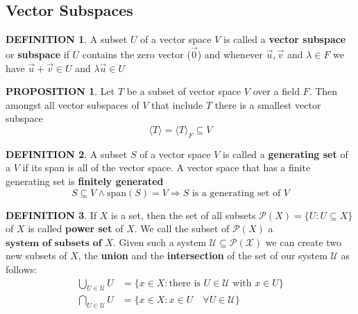 \documentclass[12pt]{article}
\theoremstyle{definition}
\newtheorem{definition}{DEFINITION}[subsection]
\newtheorem{prop}{PROPOSITION}[subsection]
\begin{document}
\subsection{Vector Subspaces}
\begin{definition}
    A subset $U$ of a vector space $V$ is called a \textbf{vector subspace} or \textbf{subspace} if $U$ contains the zero vector ($\overrightarrow{0}$) and whenever $\overrightarrow{u},\overrightarrow{v}$ and $\lambda \in F$ we have $\overrightarrow{u}+\overrightarrow{v}\in U$ and $\lambda\overrightarrow{u}\in U$
\end{definition}
\begin{prop}
    Let $T$ be a subset of vector space $V$ over a field $F$. Then amongst all vector subspaces of $V$ that include $T$ there is a smallest vector subspace
    $$\langle T \rangle = \langle T \rangle_F \subseteq V$$
\end{prop}
\begin{definition}
    A subset $S$ of a vector space $V$ is called a \textbf{generating set} of a $V$ if its span is all of the vector space. A vector space that has a finite generating set is \textbf{finitely generated}
    $$ S \subseteq V \wedge \text{span}(S) = V \Rightarrow \text{$S$ is a generating set of $V$}$$
\end{definition}
\begin{definition}
    If $X$ is a set, then the set of all subsets $\mathcal{P}(X) = \{U:U \subseteq X\}$ of $X$ is called \textbf{power set} of $X$. We call the subset of $\mathcal{P}(X)$ a $\textbf{system of subsets of $X$}$. Given such a system $\mathcal{U \subseteq \mathcal{P}(X)}$ we can create two new subsets of $X$, the \textbf{union} and the \textbf{intersection} of the set of our system $\mathcal{U}$ as follows:
    \[
        \begin{split}
            \bigcup_{U \in \mathcal{U}} U &= \{x \in X: \text{there is } U \in \mathcal{U} \text{ with } x \in U\}\\
            \bigcap_{U \in \mathcal{U}} U &= \{x \in X: x \in U \quad\forall U \in \mathcal{U}\}
        \end{split}
    \]
\end{definition}

\end{document}
